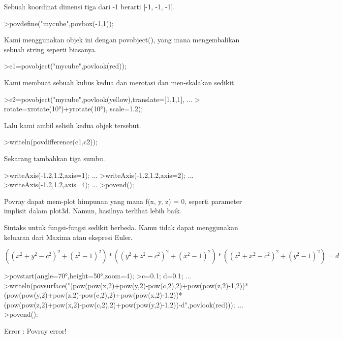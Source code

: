 \documentclass[a4paper,10pt]{article}
\begin{document}
\begin{eulernotebook}
\begin{eulercomment}
Sebuah koordinat dimensi tiga dari -1 berarti [-1, -1, -1].
\end{eulercomment}
\begin{eulerprompt}
>povdefine("mycube",povbox(-1,1));
\end{eulerprompt}
\begin{eulercomment}
Kami menggunakan objek ini dengan povobject(), yang mana mengembalikan
sebuah string seperti biasanya.
\end{eulercomment}
\begin{eulerprompt}
>c1=povobject("mycube",povlook(red));
\end{eulerprompt}
\begin{eulercomment}
Kami membuat sebuah kubus kedua dan merotasi dan men-skalakan sedikit.
\end{eulercomment}
\begin{eulerprompt}
>c2=povobject("mycube",povlook(yellow),translate=[1,1,1], ...
>  rotate=xrotate(10°)+yrotate(10°), scale=1.2);
\end{eulerprompt}
\begin{eulercomment}
Lalu kami ambil selisih kedua objek tersebut.
\end{eulercomment}
\begin{eulerprompt}
>writeln(povdifference(c1,c2));
\end{eulerprompt}
\begin{eulercomment}
Sekarang tambahkan tiga sumbu.
\end{eulercomment}
\begin{eulerprompt}
>writeAxis(-1.2,1.2,axis=1); ...
>writeAxis(-1.2,1.2,axis=2); ...
>writeAxis(-1.2,1.2,axis=4); ...
>povend();
\end{eulerprompt}
\begin{eulercomment}
Povray dapat mem-plot himpunan yang mana f(x, y, z) = 0, seperti
parameter implisit dalam plot3d. Namun, hasilnya terlihat lebih baik.

Sintaks untuk fungsi-fungsi sedikit berbeda. Kamu tidak dapat
menggunakan keluaran dari Maxima atau ekspresi Euler.

\end{eulercomment}
\begin{eulerformula}
\[
((x^2+y^2-c^2)^2+(z^2-1)^2)*((y^2+z^2-c^2)^2+(x^2-1)^2)*((z^2+x^2-c^2)^2+(y^2-1)^2)=d
\]
\end{eulerformula}
\begin{eulerprompt}
>povstart(angle=70°,height=50°,zoom=4);
>c=0.1; d=0.1; ...
>writeln(povsurface("(pow(pow(x,2)+pow(y,2)-pow(c,2),2)+pow(pow(z,2)-1,2))*(pow(pow(y,2)+pow(z,2)-pow(c,2),2)+pow(pow(x,2)-1,2))*(pow(pow(z,2)+pow(x,2)-pow(c,2),2)+pow(pow(y,2)-1,2))-d",povlook(red))); ...
>povend();
\end{eulerprompt}
\begin{euleroutput}
  Error : Povray error!
  

\end{euleroutput}
\end{eulernotebook}
\end{document}
